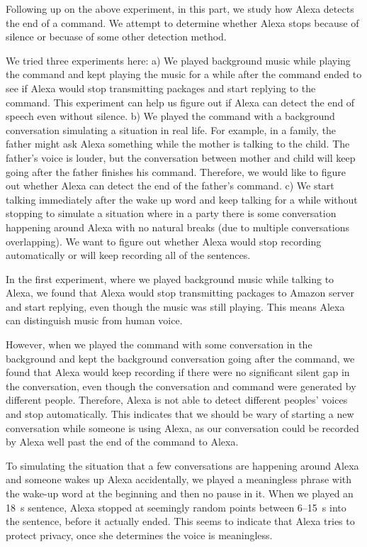Following up on the above experiment, in this part, we study how Alexa detects the end of a command. We attempt to determine whether Alexa stops because of silence or becuase of some other detection method.

We tried three experiments here: a) We played background music while playing the command and kept playing the music for a while after the command ended to see if Alexa would stop transmitting packages and start replying to the command. This experiment can help us figure out if Alexa can detect the end of speech even without silence. b) We played the command with a background conversation simulating a situation in real life. For example, in a family, the father might ask Alexa something while the mother is talking to the child. The father's voice is louder, but the conversation between mother and child will keep going after the father finishes his command. Therefore, we would like to figure out whether Alexa can detect the end of the father's command. c) We start talking immediately after the wake up word and keep talking for a while without stopping to simulate a situation where in a party there is some conversation happening around Alexa with no natural breaks (due to multiple conversations overlapping). We want to figure out whether Alexa would stop recording automatically or will keep recording all of the sentences.

In the first experiment, where we played background music while talking to Alexa, we found that Alexa would stop transmitting packages to Amazon server and start replying, even though the music was still playing. This means Alexa can distinguish music from human voice.

However, when we played the command with some conversation in the background and kept the background conversation going after the command, we found that Alexa would keep recording if there were no significant silent gap in the conversation, even though the conversation and command were generated by different people. Therefore, Alexa is not able to detect different peoples' voices and stop automatically. This indicates that we should be wary of starting a new conversation while someone is using Alexa, as our conversation could be recorded by Alexa well past the end of the command to Alexa. 

To simulating the situation that a few conversations are happening around Alexa and someone wakes up Alexa accidentally, we played a meaningless phrase with the wake-up word at the beginning and then no pause in it. When we played an 18~s sentence, Alexa stopped at seemingly random points between 6--15~s into the sentence, before it actually ended. This seems to indicate that Alexa tries to protect privacy, once she determines the voice is meaningless.

